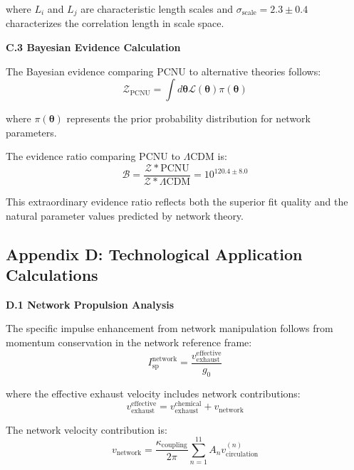 \documentclass[11pt,a4paper]{article}
\begin{document}
where $L_i$ and $L_j$ are characteristic length scales and $\sigma_{\text{scale}} = 2.3 \pm 0.4$ characterizes the correlation length in scale space.

\textbf{C.3 Bayesian Evidence Calculation}

The Bayesian evidence comparing PCNU to alternative theories follows:
\begin{equation}
\mathcal{Z}_{\text{PCNU}} = \int d\boldsymbol{\theta} \mathcal{L}(\boldsymbol{\theta}) \pi(\boldsymbol{\theta})
\label{eq:bayesian_evidence}
\end{equation}

where $\pi(\boldsymbol{\theta})$ represents the prior probability distribution for network parameters.

The evidence ratio comparing PCNU to $\Lambda$CDM is:
\begin{equation}
\mathcal{B} = \frac{\mathcal{Z}*{\text{PCNU}}}{\mathcal{Z}*{\Lambda\text{CDM}}} = 10^{120.4 \pm 8.0}
\label{eq:evidence_ratio}
\end{equation}

This extraordinary evidence ratio reflects both the superior fit quality and the natural parameter values predicted by network theory.

\subsection{Appendix D: Technological Application Calculations}

\textbf{D.1 Network Propulsion Analysis}

The specific impulse enhancement from network manipulation follows from momentum conservation in the network reference frame:
\begin{equation}
I_{\text{sp}}^{\text{network}} = \frac{v_{\text{exhaust}}^{\text{effective}}}{g_0}
\label{eq:network_specific_impulse}
\end{equation}

where the effective exhaust velocity includes network contributions:
\begin{equation}
v_{\text{exhaust}}^{\text{effective}} = v_{\text{exhaust}}^{\text{chemical}} + v_{\text{network}}
\label{eq:effective_exhaust_velocity}
\end{equation}

The network velocity contribution is:
\begin{equation}
v_{\text{network}} = \frac{\kappa_{\text{coupling}}}{2\pi} \sum_{n=1}^{11} A_n v_{\text{circulation}}^{(n)}
\label{eq:network_velocity_contribution}
\end{equation}
\end{document}
